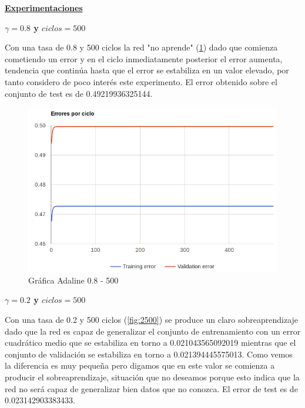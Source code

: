 \documentclass[11pt,spanish,listoffigures,listoftables]{tfgetsinf}
\begin{document}
\par \underline{\textbf{Experimentaciones}}

\par \textbf{$\gamma = 0.8$ y $ciclos = 500$}

\par Con una tasa de 0.8 y 500 ciclos la red "no aprende" (\ref{fig:8500}) dado que comienza cometiendo un error y en el ciclo inmediatamente posterior el error aumenta, tendencia que continúa hasta que el error se estabiliza en un valor elevado, por tanto considero de poco interés este experimento. El error obtenido sobre el conjunto de test es de 0.49219936325144.

\begin{figure}[H]
\centering
\includegraphics[scale=0.5]{8500}
\caption{Gráfica Adaline 0.8 - 500}\label{fig:8500}
\end{figure}

\par \textbf{$\gamma = 0.2$ y $ciclos = 500$}

\par Con una tasa de 0.2 y 500 ciclos (\ref{fig:2500}) se produce un claro sobreaprendizaje dado que la red es capaz de generalizar el conjunto de entrenamiento con un error cuadrático medio que se estabiliza en torno a 0.021043565092019 mientras que el conjunto de validación se estabiliza en torno a 0.021394445575013. Como vemos la diferencia es muy pequeña pero digamos que en este valor se comienza a producir el sobreaprendizaje, situación que no deseamos porque esto indica que la red no será capaz de generalizar bien datos que no conozca. El error de test es de 0.023142903383433.
\end{document}
